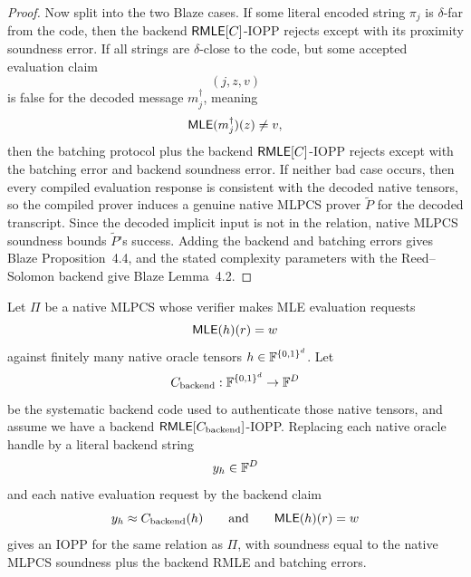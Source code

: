 \begin{proof}
Now split into the two Blaze cases.  If some literal encoded string \(\pi_j\)
is \(\delta\)-far from the code, then the backend \(\mathsf{RMLE}[C]\)-IOPP rejects
except with its proximity soundness error.  If all strings are \(\delta\)-close
to the code, but some accepted evaluation claim
\[
  (j,z,v)
\]
is false for the decoded message \(m_j^\dagger\), meaning
\[
  \mathsf{MLE}(m_j^\dagger)(z)\ne v,
\]
then the batching protocol plus the backend \(\mathsf{RMLE}[C]\)-IOPP rejects except
with the batching error and backend soundness error.  If neither bad case
occurs, then every compiled evaluation response is consistent with the decoded
native tensors, so the compiled prover induces a genuine native MLPCS prover
\(\widetilde P\) for the decoded transcript.  Since the decoded implicit input
is not in the relation, native MLPCS soundness bounds \(\widetilde P\)'s
success.  Adding the backend and batching errors gives Blaze Proposition~4.4,
and the stated complexity parameters with the Reed--Solomon backend give
Blaze Lemma~4.2.
\end{proof}

\begin{lemma}
\label{lem:mlpcs-to-rmle-compiler-handle}
Let \(\Pi\) be a native MLPCS whose verifier makes MLE evaluation requests
\[
  \mathsf{MLE}(h)(r)=w
\]
against finitely many native oracle tensors \(h\in\mathbb{F}^{\{0,1\}^d}\).  Let
\[
  C_{\mathrm{backend}}:\mathbb{F}^{\{0,1\}^d}\to\mathbb{F}^{D}
\]
be the systematic backend code used to authenticate those native tensors, and
assume we have a backend \(\mathsf{RMLE}[C_{\mathrm{backend}}]\)-IOPP.  Replacing each
native oracle handle by a literal backend string
\[
  y_h\in\mathbb{F}^D
\]
and each native evaluation request by the backend claim
\[
  y_h\approx C_{\mathrm{backend}}(h)
  \qquad\text{and}\qquad
  \mathsf{MLE}(h)(r)=w
\]
gives an IOPP for the same relation as \(\Pi\), with soundness equal to the
native MLPCS soundness plus the backend RMLE and batching errors.
\end{lemma}

